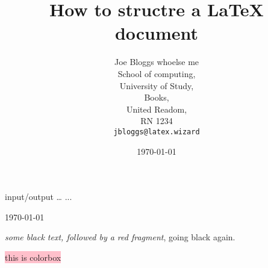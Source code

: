 \documentclass{article}
\title{How to structre a \LaTeX{} document}
\author{Joe Bloggs  whoelse me \\
        School of computing, \\
        University of Study, \\
        Books, \\
        United Readom, \\
        RN 1234\\
        \texttt{jbloggs@latex.wizard}}
\date{\today}
\begin{document}
    \maketitle


    input\slash output
    \ldots
    ...

    \today

    \emph{some black text, \color{red} followed by a red fragment}, going black again.

    \colorbox{pink}{this is colorbox}
\end{document}
